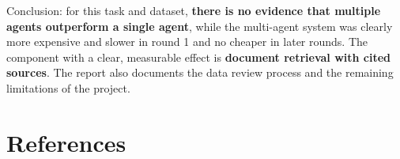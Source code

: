 \documentclass[12pt,a4paper,oneside]{report}
\begin{document}
Conclusion: for this task and dataset, \textbf{there is no evidence that multiple agents outperform a single agent}, while the multi-agent system was clearly more expensive and slower in round 1 and no cheaper in later rounds. The component with a clear, measurable effect is \textbf{document retrieval with cited sources}. The report also documents the data review process and the remaining limitations of the project.

\tableofcontents

\listoffigures
{}

\listoftables
{}



\clearpage
{}










\chapter*{References}


\appendix
\renewcommand{\tienochuong}{APPENDIX}

\end{document}
